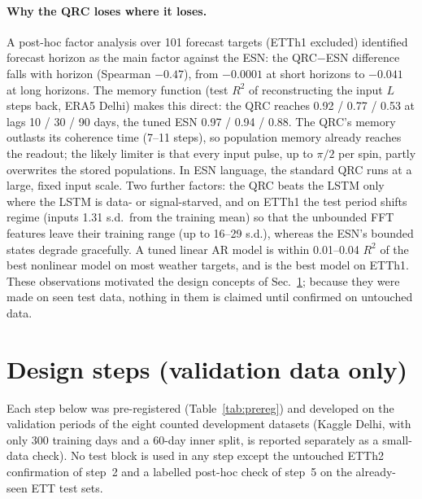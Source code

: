 \documentclass[aps,prresearch,preprint,superscriptaddress,amsmath,amssymb,floatfix]{revtex4-2}
\begin{document}
\paragraph*{Why the QRC loses where it loses.}
A post-hoc factor analysis over 101 forecast targets (ETTh1 excluded) identified
forecast horizon as the main factor against the ESN: the QRC$-$ESN difference falls
with horizon (Spearman $-0.47$), from $-0.0001$ at short horizons to $-0.041$ at long
horizons. The memory function (test $R^2$ of reconstructing the input $L$ steps back,
ERA5 Delhi) makes this direct: the QRC reaches 0.92 / 0.77 / 0.53 at lags 10 / 30 / 90
days, the tuned ESN 0.97 / 0.94 / 0.88. The QRC's memory outlasts its coherence time
(7--11 steps), so population memory already reaches the readout; the likely limiter is
that every input pulse, up to $\pi/2$ per spin, partly overwrites the stored
populations. In ESN language, the standard QRC runs at a large, fixed input scale.
Two further factors: the QRC beats the LSTM only where the LSTM is data- or
signal-starved, and on ETTh1 the test period shifts regime (inputs 1.31 s.d.\ from
the training mean) so that the unbounded FFT features leave their training range (up to
16--29 s.d.), whereas the ESN's bounded states degrade gracefully. A tuned linear AR
model is within 0.01--0.04 $R^2$ of the best nonlinear model on most weather targets,
and is the best model on ETTh1. These observations motivated the design concepts of
Sec.~\ref{sec:design}; because they were made on seen test data, nothing in them is
claimed until confirmed on untouched data.

\section{Design steps (validation data only)}\label{sec:design}
Each step below was pre-registered (Table~\ref{tab:prereg}) and developed on the
validation periods of the eight counted development datasets (Kaggle Delhi, with only
300 training days and a 60-day inner split, is reported separately as a small-data
check). No test block is used in any step except the untouched ETTh2 confirmation of
step~2 and a labelled post-hoc check of step~5 on the already-seen ETT test sets.
\end{document}
